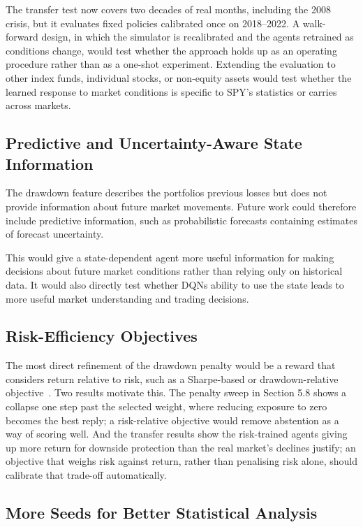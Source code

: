 The transfer test now covers two decades of real months, including the
2008 crisis, but it evaluates fixed policies calibrated once on
2018--2022. A walk-forward design, in which the simulator is
recalibrated and the agents retrained as conditions change, would test
whether the approach holds up as an operating procedure rather than as
a one-shot experiment. Extending the evaluation to other index funds,
individual stocks, or non-equity assets would test whether the learned
response to market conditions is specific to SPY's statistics or carries
across markets.

\subsection{Predictive and Uncertainty-Aware State Information}

The drawdown feature describes the portfolio\textquotesingle s previous
losses but does not provide information about future market movements.
Future work could therefore include predictive information, such as
probabilistic forecasts containing estimates of forecast uncertainty.

This would give a state-dependent agent more useful information for
making decisions about future market conditions rather than relying only
on historical data. It would also directly test whether
DQN\textquotesingle s ability to use the state leads to more useful
market understanding and trading decisions.

\subsection{Risk-Efficiency Objectives}

The most direct refinement of the drawdown penalty would be a reward
that considers return relative to risk, such as a Sharpe-based or
drawdown-relative objective~\cite{moody2001}. Two results motivate
this. The penalty sweep in Section 5.8 shows a collapse one step past
the selected weight, where reducing exposure to zero becomes the best
reply;
a risk-relative objective would remove abstention as a way of scoring
well. And the transfer results show the risk-trained agents giving up
more return for downside protection than the real market's declines
justify; an objective that weighs risk against return, rather than
penalising risk alone, should calibrate that trade-off automatically.

\subsection{More Seeds for Better Statistical Analysis}


